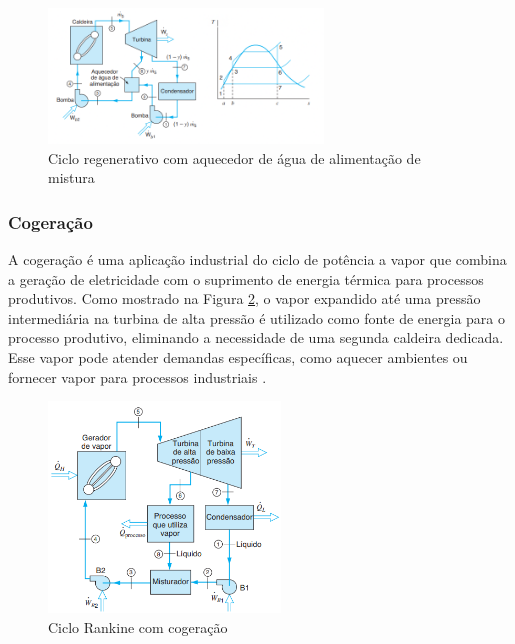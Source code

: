 \documentclass[
	article,			%
	11pt,				%
	oneside,			%
	a4paper,			%
	english,			%
	brazil,				%
	sumario=tradicional
	]{abntex2}
\begin{document}
\begin{figure}[h]
	\centering
	\includegraphics[width=0.65\textwidth]{./images/regenerativo-aquecedor.png}
	\caption{Ciclo regenerativo com aquecedor de água de alimentação de mistura}
	\label{fig:reg-aquecedor}
\end{figure}

\subsubsection{Cogeração}

A cogeração é uma aplicação industrial do ciclo de potência a vapor que combina a geração de eletricidade com o suprimento de energia térmica para processos produtivos. Como mostrado na Figura \ref{fig:cogeracao}, o vapor expandido até uma pressão intermediária na turbina de alta pressão é utilizado como fonte de energia para o processo produtivo, eliminando a necessidade de uma segunda caldeira dedicada. Esse vapor pode atender demandas específicas, como aquecer ambientes ou fornecer vapor para processos industriais \cite{borgnakke-2020}.

\begin{figure}[h]
	\centering
	\includegraphics[width=0.55\textwidth]{./images/cogeracao.png}
	\caption{Ciclo Rankine com cogeração}
	\label{fig:cogeracao}
\end{figure}
\end{document}
